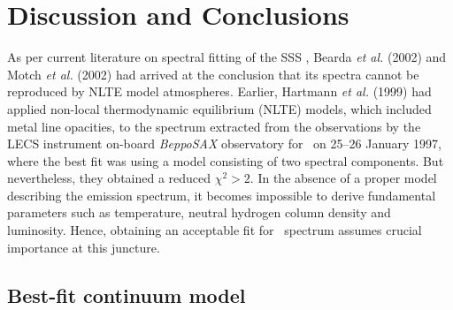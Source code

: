 \section{Discussion and Conclusions}
	As per current literature on spectral fitting of the SSS \source, Bearda \textit{et al.} (2002) and Motch \textit{et al.} (2002) had arrived at the conclusion that its spectra cannot be reproduced by NLTE model atmospheres. %
	Earlier, Hartmann \textit{et al.} (1999) had applied non-local thermodynamic equilibrium (NLTE) models, which included metal line opacities, to the spectrum extracted from the observations by the LECS instrument on-board \textit{BeppoSAX} observatory for \source\ on 25--26 January 1997, %
	where the best fit was using a model consisting of two spectral components. But nevertheless, they obtained a reduced $\chi^2>2$. In the absence of a proper model describing the emission spectrum, it becomes impossible to derive fundamental parameters such as temperature, neutral hydrogen column density and luminosity. %
	Hence, obtaining an acceptable fit for \source\ spectrum assumes crucial importance at this juncture.
%			
	
	\subsection{Best-fit continuum model}
	
